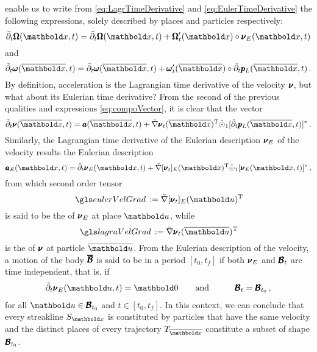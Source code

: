 enable us to write from \eqref{eq:LagrTimeDerivative} and \eqref{eq:EulerTimeDerivative} the following expressions, solely described by places and particles respectively:   
\begin{equation}
\bar{\partial}_t\tnr{\Omega}({\vto{x}},t)=\tilde{\partial}_t\tnr{\Omega}({\vto{x}},t)+\tnr{\Omega}_t'(\vto{x})\circ\tnr{\nu}_E(\vto{x},t)
\end{equation}
and
\begin{equation}
\tilde{\partial}_t\tnr{\omega}(\overline{\vto{x}},t)=\bar{\partial}_t\tnr{\omega}(\overline{\vto{x}},t)+\tnr{\omega}_t'(\overline{\vto{x}})\circ\tilde{\partial}_t \tnr{p}_L(\overline{\vto{x}},t)\,.
\end{equation}
By definition, acceleration is the Lagrangian time derivative of the velocity $\pmb{\nu}$, but what about its Eulerian time derivative? From the second of the previous qualities and expressions \eqref{eq:compoVector}, it is clear that the vector 
\begin{equation}
\tilde{\partial}_t\tnr{\nu}(\overline{\vto{x}},t)=\tnr{a}(\overline{\vto{x}},t)+\fua{\bar{\nabla}\tnr{\nu}_t}{\overline{\vto{x}}}^{\text{T}}\hat{\odot}_1[\tilde{\partial}_t \tnr{p}_L(\overline{\vto{x}},t)]^*\,.
\end{equation}
Similarly, the Lagrangian time derivative of the Eulerian description $\pmb{\nu}_E$ of the velocity results the Eulerian description  
\begin{equation}
\tnr{a}_E(\vto{x},t)=\tilde{\partial}_t\tnr{\nu}_E({\vto{x}},t)+\fua{\tilde{\nabla}[\tnr{\nu}_t]_E}{{\vto{x}}}^{\text{T}}\hat{\odot}_1[{\tnr{\nu}_E}(\vto{x},t)]^*\,,
\end{equation}
from which second order tensor 
 \begin{equation}\label{eq:eulerVelocityGrad}
\gloref{eulerVelGrad}:=\fua{\tilde{\nabla}[\tnr{\nu}_t]_E}{{\vto{u}}}^{\text{T}}
 \end{equation}
is said to be the  of $\pmb{\nu}_E$ at place $\vto{u}$, while
 \begin{equation}\label{eq:lagrangVelocityGrad}
\gloref{lagraVelGrad}:=\fua{\bar{\nabla}\tnr{\nu}_t}{\overline{\vto{u}}}^{\text{T}}
 \end{equation}
is the  of $\pmb{\nu}$ at particle $\overline{\vto{u}}$. From the Eulerian description of the velocity, a motion of the body $\pmb{\overline{\mathcal{B}}}$ is said to be  in a period $[t_0,t_f]$ if both $\pmb{\nu}_E$ and $\pmb{\mathcal{B}}_t$  are time independent, that is, if
\begin{alignat}{3} 
\tilde{\partial}_t\tnr{\nu}_E(\vto{u},t)=\vto{0} &\qquad \text{and}\qquad & \tnr{\mathcal{B}}_t= \tnr{\mathcal{B}}_{t_0}\,,
\end{alignat}
for all $\vto{u}\in\tnr{\mathcal{B}}_{t_0}$ and $t\in [t_0,t_f]$. In this context, we can conclude that every streakline $S_{\vto{x}}$ is constituted by particles that have the same velocity and the distinct places of every trajectory $T_{\overline{\vto{x}}}$ constitute a subset of shape $\pmb{\mathcal{B}}_{t_0}$.


